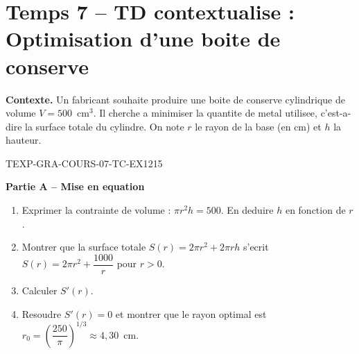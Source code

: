 

\section*{Temps 7 -- TD contextualise : Optimisation d'une boite de conserve}

\textbf{Contexte.} Un fabricant souhaite produire une boite de conserve cylindrique de volume $V = 500$~cm$^3$. Il cherche a minimiser la quantite de metal utilisee, c'est-a-dire la surface totale du cylindre. On note $r$ le rayon de la base (en cm) et $h$ la hauteur.

\bigskip


\begin{exercice}{TEXP-GRA-COURS-07-TC-EX1}{2}{15}

\textbf{Partie A -- Mise en equation}

\begin{enumerate}
  \item Exprimer la contrainte de volume : $\pi r^2 h = 500$. En deduire $h$ en fonction de $r$.
  \item Montrer que la surface totale $S(r) = 2\pi r^2 + 2\pi r h$ s'ecrit $S(r) = 2\pi r^2 + \dfrac{1000}{r}$ pour $r > 0$.
  \item Calculer $S'(r)$.
  \item Resoudre $S'(r) = 0$ et montrer que le rayon optimal est $r_0 = \left(\dfrac{250}{\pi}\right)^{1/3} \approx 4{,}30$~cm.
\end{enumerate}

\end{exercice}

